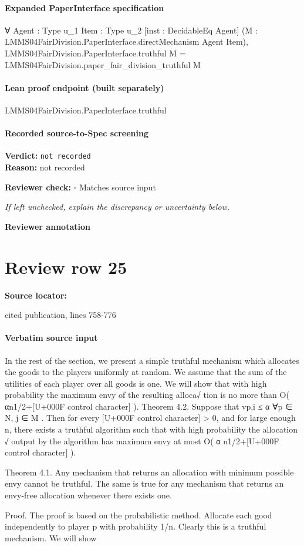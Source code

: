 \documentclass[10pt]{article}
\newcommand{\reviewerbox}{%
  \par\noindent\fbox{\parbox{0.96\linewidth}{\rule{0pt}{0.38in}}}\par
}
\newcommand{\reviewmatch}[1]{%
  \par\noindent\textbf{Reviewer check:} $\square$\; #1\par
  \noindent\emph{If left unchecked, explain the discrepancy or uncertainty below.}\par
}
\begin{document}
\paragraph{Expanded PaperInterface specification}
\begin{ReviewVerbatim}
∀ {Agent : Type u_1} {Item : Type u_2} [inst : DecidableEq Agent]
  (M : LMMS04FairDivision.PaperInterface.directMechanism Agent Item),
  LMMS04FairDivision.PaperInterface.truthful M = LMMS04FairDivision.paper_fair_division_truthful M
\end{ReviewVerbatim}

\paragraph{Lean proof endpoint (built separately)}\begin{ReviewVerbatim}
LMMS04FairDivision.PaperInterface.truthful
\end{ReviewVerbatim}

\paragraph{Recorded source-to-Spec screening}
\textbf{Verdict:} \texttt{not recorded}
\\
\textbf{Reason:} not recorded
\reviewmatch{Matches source input}
\noindent\textbf{Reviewer annotation}\par
\reviewerbox
\clearpage
\hypertarget{source-claim-5fb3f82f1adf7c6f}{}
\section*{Review row 25}
\textbf{Source locator:} {\footnotesize\raggedright cited publication, lines 758-\allowbreak{}776\par}
\paragraph{Verbatim source input}
\begin{ReviewVerbatim}
In the rest of the section, we present a simple truthful
mechanism which allocates the goods to the players uniformly at random. We assume that the sum of the utilities
of each player over all goods is one. We will show that with
high probability the maximum
envy of the resulting alloca√
tion is no more than O( αn1/2+[U+000F control character] ).
Theorem 4.2. Suppose that vp,i ≤ α ∀p ∈ N, j ∈ M .
Then for every [U+000F control character] > 0, and for large enough n, there exists
a truthful algorithm such that with high probability the allocation
√ output by the algorithm has maximum envy at most
O( α n1/2+[U+000F control character] ).

Theorem 4.1. Any mechanism that returns an allocation
with minimum possible envy cannot be truthful. The same is
true for any mechanism that returns an envy-free allocation
whenever there exists one.

Proof. The proof is based on the probabilistic method.
Allocate each good independently to player p with probability 1/n. Clearly this is a truthful mechanism. We will show
\end{ReviewVerbatim}
\end{document}

